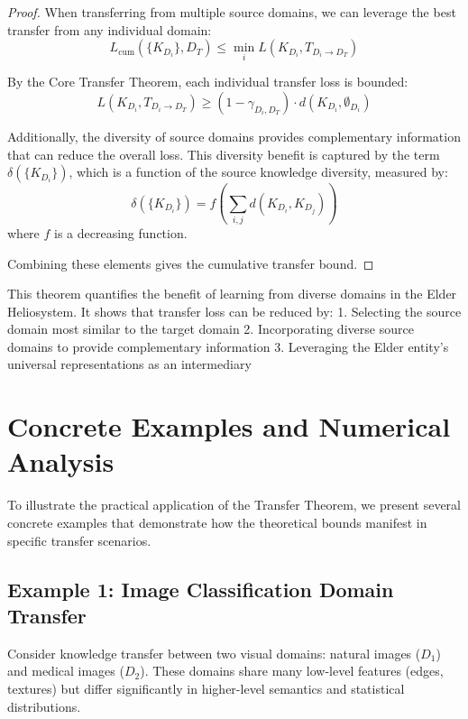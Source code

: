 \begin{proof}
When transferring from multiple source domains, we can leverage the best transfer from any individual domain:
\begin{equation}
L_{\text{cum}}(\{K_{D_i}\}, D_T) \leq \min_{i} L(K_{D_i}, T_{D_i \to D_T})
\end{equation}

By the Core Transfer Theorem, each individual transfer loss is bounded:
\begin{equation}
L(K_{D_i}, T_{D_i \to D_T}) \geq (1 - \gamma_{D_i,D_T}) \cdot d(K_{D_i}, \emptyset_{D_i})
\end{equation}

Additionally, the diversity of source domains provides complementary information that can reduce the overall loss. This diversity benefit is captured by the term $\delta(\{K_{D_i}\})$, which is a function of the source knowledge diversity, measured by:
\begin{equation}
\delta(\{K_{D_i}\}) = f\left(\sum_{i,j} d(K_{D_i}, K_{D_j})\right)
\end{equation}
where $f$ is a decreasing function.

Combining these elements gives the cumulative transfer bound.
\end{proof}

This theorem quantifies the benefit of learning from diverse domains in the Elder Heliosystem. It shows that transfer loss can be reduced by:
1. Selecting the source domain most similar to the target domain
2. Incorporating diverse source domains to provide complementary information
3. Leveraging the Elder entity's universal representations as an intermediary

\section{Concrete Examples and Numerical Analysis}

To illustrate the practical application of the Transfer Theorem, we present several concrete examples that demonstrate how the theoretical bounds manifest in specific transfer scenarios.

\subsection{Example 1: Image Classification Domain Transfer}

Consider knowledge transfer between two visual domains: natural images ($D_1$) and medical images ($D_2$). These domains share many low-level features (edges, textures) but differ significantly in higher-level semantics and statistical distributions.

